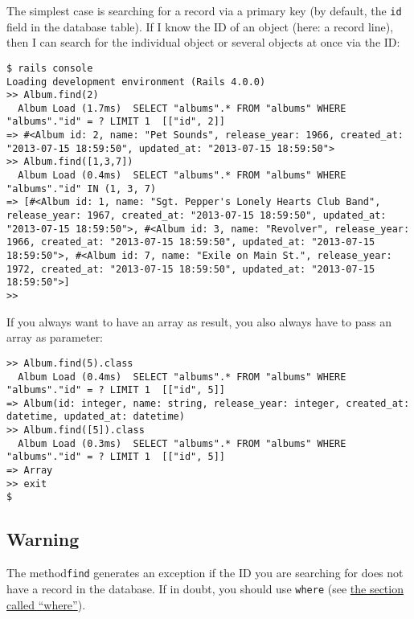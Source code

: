 \documentclass[a4paper]{book}
\newcounter{tab}[chapter]
\begin{document}
The simplest case is searching for a record via a primary key (by default, the \texttt{id} field in the database table). If I know the ID of an object (here: a record line), then I can search for the individual object or several objects at once via the ID:

\begin{shaded}\begin{verbatim}
$ rails console
Loading development environment (Rails 4.0.0)
>> Album.find(2)
  Album Load (1.7ms)  SELECT "albums".* FROM "albums" WHERE "albums"."id" = ? LIMIT 1  [["id", 2]]
=> #<Album id: 2, name: "Pet Sounds", release_year: 1966, created_at: "2013-07-15 18:59:50", updated_at: "2013-07-15 18:59:50">
>> Album.find([1,3,7])
  Album Load (0.4ms)  SELECT "albums".* FROM "albums" WHERE "albums"."id" IN (1, 3, 7)
=> [#<Album id: 1, name: "Sgt. Pepper's Lonely Hearts Club Band", release_year: 1967, created_at: "2013-07-15 18:59:50", updated_at: "2013-07-15 18:59:50">, #<Album id: 3, name: "Revolver", release_year: 1966, created_at: "2013-07-15 18:59:50", updated_at: "2013-07-15 18:59:50">, #<Album id: 7, name: "Exile on Main St.", release_year: 1972, created_at: "2013-07-15 18:59:50", updated_at: "2013-07-15 18:59:50">]
>>  
\end{verbatim}\end{shaded}

If you always want to have an array as result, you also always have to pass an array as parameter:

\begin{shaded}\begin{verbatim}
>> Album.find(5).class
  Album Load (0.4ms)  SELECT "albums".* FROM "albums" WHERE "albums"."id" = ? LIMIT 1  [["id", 5]]
=> Album(id: integer, name: string, release_year: integer, created_at: datetime, updated_at: datetime)
>> Album.find([5]).class
  Album Load (0.3ms)  SELECT "albums".* FROM "albums" WHERE "albums"."id" = ? LIMIT 1  [["id", 5]]
=> Array
>> exit
$
\end{verbatim}\end{shaded}

\subsection{Warning}\label{warning-1}

The method\texttt{find} generates an exception if the ID you are searching for does not have a record in the database. If in doubt, you should use \texttt{where} (see \hyperref[activerecordux5fwhere]{the section called “where”}).
\end{document}
